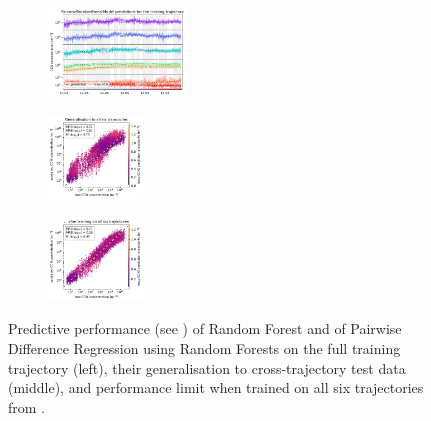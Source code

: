 \begin{figure}[H]
    \begin{subfigure}
    \centering
    \includegraphics[width=0.4\textwidth]{prediction/figures/models/pairwiserandomforestmodel-training-prediction.pdf}
    \end{subfigure}
    \begin{subfigure}
    \centering
    \includegraphics[width=0.275\textwidth]{prediction/figures/models/pairwiserandomforestmodel-test-generalisation.pdf}
    \end{subfigure}
    \begin{subfigure}
    \centering
    \includegraphics[width=0.275\textwidth]{prediction/figures/models/pairwiserandomforestmodel-test-prediction.pdf}
    \end{subfigure}

    \vspace{-1em}
    \caption[Predictive Performance of Random Forests and Pairwise Difference Regression with RFs]{Predictive performance (see ) of Random Forest and of Pairwise Difference Regression using Random Forests \cite{padre-rf-2021} on the full training trajectory (left), their generalisation to cross-trajectory test data (middle), and performance limit when trained on all six trajectories from .}
    \label{fig:rf-padre-rf-models}
\end{figure}

